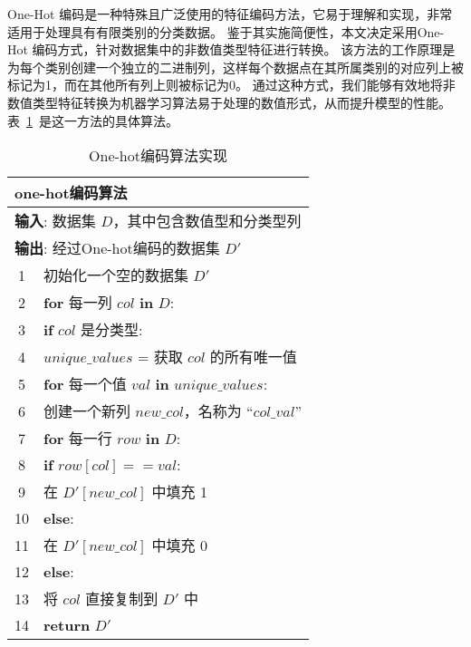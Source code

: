 One-Hot 编码是一种特殊且广泛使用的特征编码方法，它易于理解和实现，非常适用于处理具有有限类别的分类数据。
鉴于其实施简便性，本文决定采用One-Hot 编码方式，针对数据集中的非数值类型特征进行转换。
该方法的工作原理是为每个类别创建一个独立的二进制列，这样每个数据点在其所属类别的对应列上被标记为1，而在其他所有列上则被标记为0。
通过这种方式，我们能够有效地将非数值类型特征转换为机器学习算法易于处理的数值形式，从而提升模型的性能。
表~\ref{tab:onehot}~是这一方法的具体算法。\par
\begin{table}[htbp]
	\caption{One-hot编码算法实现}
	\label{tab:onehot}
	\centering
	\begin{tabularx}{1.0\textwidth}{cl}
		\toprule
		\multicolumn{2}{l}{\textbf{one-hot编码算法}}                              \\
		\midrule
		\multicolumn{2}{l}{\textbf{输入}: 数据集 $D$，其中包含数值型和分类型列}   \\
		\multicolumn{2}{l}{\textbf{输出}: 经过One-hot编码的数据集 $D'$}           \\
		1  & 初始化一个空的数据集 $D'$                                            \\
		2  & \textbf{for} 每一列 $col$ \textbf{in} $D$:                           \\
		3  & \quad \textbf{if} $col$ 是分类型:                                    \\
		4  & \quad\quad $unique\_values$ = 获取 $col$ 的所有唯一值                \\
		5  & \quad\quad \textbf{for} 每一个值 $val$ \textbf{in} $unique\_values$: \\
		6  & \quad\quad\quad 创建一个新列 $new\_col$，名称为 ``$col\_val$''       \\
		7  & \quad\quad\quad \textbf{for} 每一行 $row$ \textbf{in} $D$:           \\
		8  & \quad\quad\quad\quad \textbf{if} $row[col] == val$:                  \\
		9  & \quad\quad\quad\quad\quad 在 $D'[new\_col]$ 中填充 1                 \\
		10 & \quad\quad\quad\quad \textbf{else}:                                  \\
		11 & \quad\quad\quad\quad\quad 在 $D'[new\_col]$ 中填充 0                 \\
		12 & \quad \textbf{else}:                                                 \\
		13 & \quad\quad 将 $col$ 直接复制到 $D'$ 中                               \\
		14 & \textbf{return} $D'$                                                 \\
		\bottomrule
	\end{tabularx}
\end{table}

